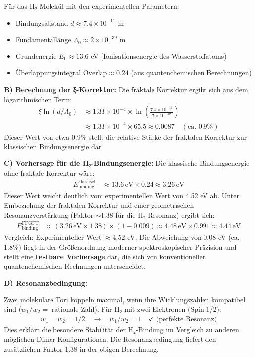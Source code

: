 \documentclass[12pt,a4paper]{article}
\begin{document}
	Für das H₂-Molekül mit den experimentellen Parametern:
	\begin{itemize}
		\item Bindungsabstand $d \approx 7.4 \times 10^{-11}$ m
		\item Fundamentallänge $\Lambda_0 \approx 2 \times 10^{-39}$ m
		\item Grundenergie $E_0 \approx 13.6$ eV (Ionisationsenergie des Wasserstoffatoms)
		\item Überlappungsintegral $\text{Overlap} \approx 0.24$ (aus quantenchemischen Berechnungen)
	\end{itemize}
	
	\textbf{B) Berechnung der ξ-Korrektur:}
	Die fraktale Korrektur ergibt sich aus dem logarithmischen Term:
	\begin{align*}
		\xi \ln(d/\Lambda_0) &\approx 1.33 \times 10^{-4} \times \ln\left(\frac{7.4 \times 10^{-11}}{2 \times 10^{-39}}\right) \\
		&\approx 1.33 \times 10^{-4} \times 65.5 \approx 0.0087 \quad (\text{ca. } 0.9\%)
	\end{align*}
	Dieser Wert von etwa 0.9\% stellt die relative Stärke der fraktalen Korrektur zur klassischen Bindungsenergie dar.
	
	\textbf{C) Vorhersage für die H₂-Bindungsenergie:}
	Die klassische Bindungsenergie ohne fraktale Korrektur wäre:
	\begin{align*}
		E_{\text{binding}}^{\text{klassisch}} &\approx 13.6 \, \text{eV} \times 0.24 \approx 3.26 \, \text{eV}
	\end{align*}
	Dieser Wert weicht deutlich vom experimentellen Wert von 4.52 eV ab. Unter Einbeziehung der fraktalen Korrektur und einer geometrischen Resonanzverstärkung (Faktor $\sim 1.38$ für die H₂-Resonanz) ergibt sich:
	\begin{align*}
		E_{\text{binding}}^{\text{FFGFT}} &\approx (3.26 \, \text{eV} \times 1.38) \times (1 - 0.009) \approx 4.48 \, \text{eV} \times 0.991 \approx 4.44 \, \text{eV}
	\end{align*}
	Vergleich: Experimenteller Wert $\approx 4.52$ eV. Die Abweichung von $0.08$ eV (ca. 1.8\%) liegt in der Größenordnung moderner spektroskopischer Präzision und stellt eine \textbf{testbare Vorhersage} dar, die sich von konventionellen quantenchemischen Rechnungen unterscheidet.
	
	\textbf{D) Resonanzbedingung:}
	
	Zwei molekulare Tori koppeln maximal, wenn ihre Wicklungszahlen kompatibel sind ($w_1/w_2 =$ rationale Zahl). Für H₂ mit zwei Elektronen (Spin 1/2):
	\begin{align*}
		w_1 = w_2 = 1/2 \quad \rightarrow \quad w_1/w_2 = 1 \quad \checkmark \text{ (perfekte Resonanz)}
	\end{align*}
	Dies erklärt die besondere Stabilität der H₂-Bindung im Vergleich zu anderen möglichen Dimer-Konfigurationen. Die Resonanzbedingung liefert den zusätzlichen Faktor 1.38 in der obigen Berechnung.
	
\end{document}
